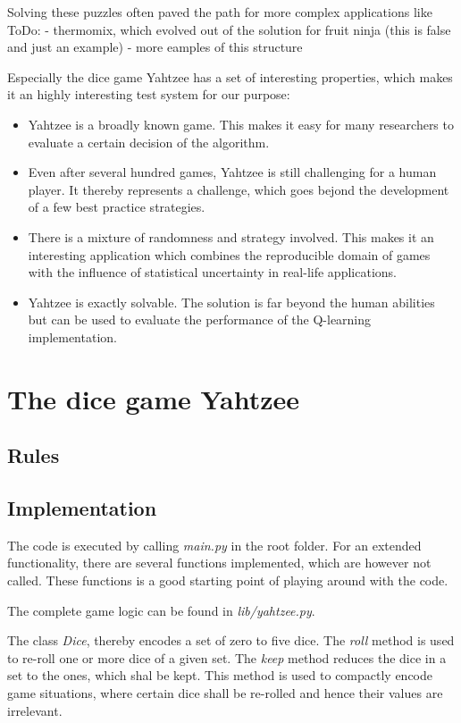 \documentclass{article}
\begin{document}
Solving these puzzles often paved the path for more complex applications like
ToDo:
- thermomix, which evolved out of the solution for fruit ninja (this is false and just an example)
- more eamples of this structure

Especially the dice game Yahtzee has a set of interesting properties,
which makes it an highly interesting test system for our purpose:
\begin{itemize}
\item Yahtzee is a broadly known game.
This makes it easy for many researchers to evaluate a certain decision of the algorithm.
\item Even after several hundred games, Yahtzee is still challenging for a human player.
It thereby represents a challenge, which goes bejond the development of a few best practice strategies.
\item There is a mixture of randomness and strategy involved.
This makes it an interesting application which combines the reproducible domain of games
with the influence of statistical uncertainty in real-life applications.
\item Yahtzee is exactly solvable.
The solution is far beyond the human abilities but can be used to evaluate the performance
of the Q-learning implementation.
\end{itemize}


\section{The dice game Yahtzee}

\subsection{Rules}

\subsection{Implementation}
The code is executed by calling \emph{main.py} in the root folder.
For an extended functionality, there are several functions implemented, which are however not called.
These functions is a good starting point of playing around with the code.

The complete game logic can be found in \emph{lib/yahtzee.py}.

The class \emph{Dice}, thereby encodes a set of zero to five dice.
The \emph{roll} method is used to re-roll one or more dice of a given set.
The \emph{keep} method reduces the dice in a set to the ones, which shal be kept.
This method is used to compactly encode game situations, 
where certain dice shall be re-rolled and hence their values are irrelevant.
\end{document}
